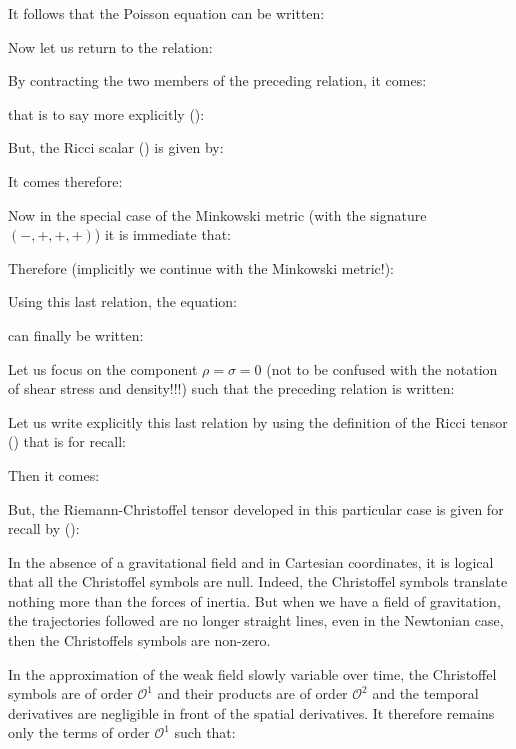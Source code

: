 	It follows that the Poisson equation can be written:
	
	Now let us return to the relation:
	
	By contracting the two members of the preceding relation, it comes:
	
	that is to say more explicitly ():
	
	But, the Ricci scalar () is given by:
	
	It comes therefore:
	
	Now in the special case of the Minkowski metric (with the signature $(-, +, +, +)$) it is immediate that:
	
	Therefore (implicitly we continue with the Minkowski metric!):
	
	Using this last relation, the equation:
	
	can finally be written:
	
	Let us focus on the component $\rho=\sigma=0$ (not to be confused with the notation of shear stress and density!!!) such that the preceding relation is written:
	
	Let us write explicitly this last relation by using the definition of the Ricci tensor () that is for recall:
	
	Then it comes:
	
	But, the Riemann-Christoffel tensor developed in this particular case is given for recall by ():
	
	\begin{tcolorbox}[title=Remark,colframe=black,arc=10pt]
	In the absence of a gravitational field and in Cartesian coordinates, it is logical that all the Christoffel symbols are null. Indeed, the Christoffel symbols translate nothing more than the forces of inertia. But when we have a field of gravitation, the trajectories followed are no longer straight lines, even in the Newtonian case, then the Christoffels symbols are non-zero.
	\end{tcolorbox}
	In the approximation of the weak field slowly variable over time, the Christoffel symbols are of order $\mathcal{O}^1$ and their products are of order $\mathcal{O}^2$ and the temporal derivatives are negligible in front of the spatial derivatives. It therefore remains only the terms of order $\mathcal{O}^1$ such that:
	
